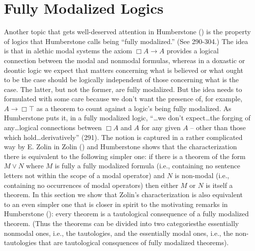 \documentclass[
  10pt,
  letterpaper,
  DIV=11,
  numbers=noendperiod,
  twoside]{scrartcl}
\begin{document}
\section{Fully Modalized Logics}\label{fully-modalized-logics}

Another topic that gets well-deserved attention in Humberstone
() is the property of logics that
Humberstone calls being ``fully modalized.'' (See 290-304.) The idea is
that in alethic modal systems the axiom \(\Box A\rightarrow A\) provides
a logical connection between the modal and nonmodal formulas, whereas in
a doxastic or deontic logic we expect that matters concerning what is
believed or what ought to be the case should be logically independent of
those concerning what is the case. The latter, but not the former, are
fully modalized. But the idea needs to formulated with some care because
we don't want the presence of, for example, \(A\rightarrow \Box \top\)
as a theorem to count against a logic's being fully modalized. As
Humberstone puts it, in a fully modalized logic, ``\ldots we don't
expect\ldots the forging of any\ldots logical connections between
\(\Box A\) and \(A\) for any given \(A\) -- other than those which
hold\ldots derivatively'' (291). The notion is captured in a rather
complicated way by E. Zolin in Zolin ()
and Humberstone shows that the characterization there is equivalent to
the following simpler one: if there is a theorem of the form \(M\vee N\)
where \(M\) is fully a fully modalized formula (i.e., containing no
sentence letters not within the scope of a modal operator) and \(N\) is
non-modal (i.e., containing no occurrences of modal operators) then
either \(M\) or \(N\) is itself a theorem. In this section we show that
Zolin's characterization is also equivalent to an even simpler one that
is closer in spirit to the motivating remarks in Humberstone
(): every theorem is a tautological
consequence of a fully modalized theorem. (Thus the theorems can be
divided into two categoriesthe essentially nonmodal ones, i.e., the
tautologies, and the essentially modal ones, i.e., the non-tautologies
that are tautological consquences of fully modalized theorems).
\end{document}
